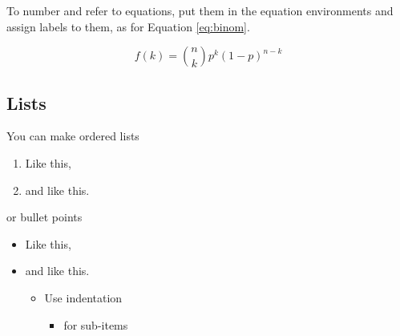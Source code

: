 \documentclass[9pt,a4paper,]{extarticle}
\begin{document}
To number and refer to equations, put them in the equation environments and assign labels to them, as for Equation \eqref{eq:binom}.

\begin{equation}
  f\left(k\right) = \binom{n}{k} p^k\left(1-p\right)^{n-k}
  \label{eq:binom}
\end{equation}

\hypertarget{lists}{%
\subsection{Lists}\label{lists}}

You can make ordered lists

\begin{enumerate}
\def\labelenumi{\arabic{enumi}.}
\item
  Like this,
\item
  and like this.
\end{enumerate}

or bullet points

\begin{itemize}
\item
  Like this,
\item
  and like this.

  \begin{itemize}
  \item
    Use indentation

    \begin{itemize}
    \item
      for sub-items
    \end{itemize}
  \end{itemize}
\end{itemize}

{\small}
\end{document}
